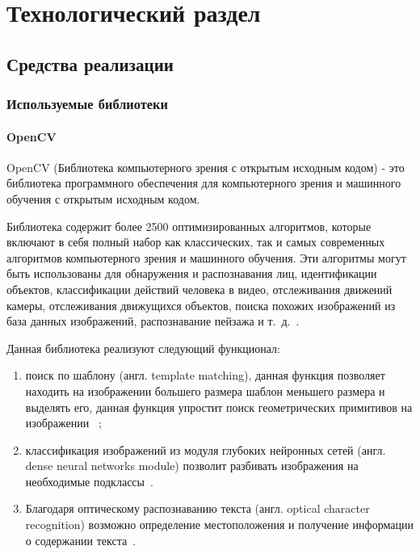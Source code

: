 \chapter{Технологический раздел}

\section{Средства реализации}


\subsection{Используемые библиотеки}

\subsubsection{OpenCV}

OpenCV (Библиотека компьютерного зрения с открытым исходным кодом) - это библиотека программного обеспечения для компьютерного зрения и машинного обучения с открытым исходным кодом.

Библиотека содержит более 2500 оптимизированных алгоритмов, которые включают в себя полный набор как классических, так и самых современных алгоритмов компьютерного зрения и машинного обучения. Эти алгоритмы могут быть использованы для обнаружения и распознавания лиц, идентификации объектов, классификации действий человека в видео, отслеживания движений камеры, отслеживания движущихся объектов, поиска похожих изображений из база данных изображений,  распознавание пейзажа и т.~д.~\cite{about_openCV}.

Данная библиотека реализуют следующий функционал:
\begin{enumerate}
	\item поиск по шаблону (англ. template matching), данная функция позволяет 
	находить на изображении большего размера шаблон меньшего размера и выделять его, данная функция упростит поиск геометрических примитивов на изображении  ~\cite{pattern_matching};
	\item классификация  изображений из модуля глубоких нейронных сетей (англ. dense neural networks module) позволит разбивать изображения на необходимые подклассы~\cite{DL_openCV}.
	
	\item Благодаря оптическому распознаванию текста (англ. optical character recognition) возможно определение местоположения и получение информации о содержании текста~\cite{OCR_openCV}.
\end{enumerate}


